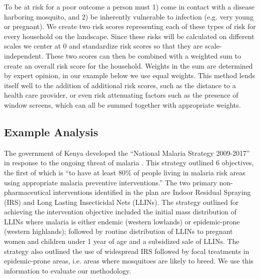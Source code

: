\documentclass{article}\usepackage[]{graphicx}\usepackage[]{color}
\begin{document}
To be at risk for a poor outcome a person must 1) come in contact with a disease harboring mosquito,  and 2) be inherently vulnerable to infection (e.g. very young or pregnant).  We create two risk scores representing each of these types of risk for every household on the landscape.  Since these risks will be calculated on different scales we center at 0 and standardize risk scores so that they are scale-independent.  These two scores can then be combined with a weighted sum to create an overall risk score for the household.  Weights in the sum are determined by expert opinion, in our example below we use equal weights.  This method lends itself well to the addition of additional risk scores, such as the distance to a health care provider, or even risk attenuating factors such as the presence of window screens, which can all be summed together with appropriate weights. 









\subsection{Example Analysis}

The government of Kenya developed the “National Malaria Strategy 2009-2017” in response to the ongoing threat of malaria \cite{Ministryofpublichealthandsanitation2009}. This strategy outlined 6 objectives,  the first of which is “to have at least 80\% of people living in malaria risk areas using appropriate malaria preventive interventions.” The two primary non-pharmaceutical interventions identified in the plan are Indoor Residual Spraying (IRS) and Long Lasting Insecticidal Nets (LLINs). The strategy outlined for achieving the intervention objective included the initial mass distribution of LLINs where malaria is either endemic (western lowlands) or epidemic-prone (western highlands); followed by routine distribution of LLINs to pregnant women and children under 1 year of age and a subsidized sale of LLINs. The strategy also outlined the use of widespread IRS followed by focal treatments in epidemic-prone areas, i.e. areas where mosquitoes are likely to breed.  We use this information to evaluate our methodology.\\

\end{document}
